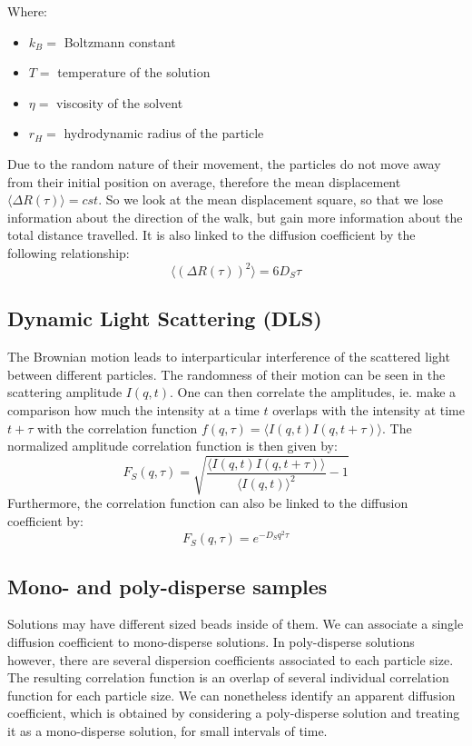 \documentclass{article}
\begin{document}
Where: \begin{itemize}
    \item $k_B =$ Boltzmann constant
    \item $T =$ temperature of the solution
    \item $\eta =$ viscosity of the solvent
    \item $r_H =$ hydrodynamic radius of the particle 
\end{itemize}

Due to the random nature of their movement, the particles do not move away from their initial position on average, therefore the mean displacement $\langle \Delta R(\tau) \rangle = cst$. So we look at the mean displacement square, so that we lose information about the direction of the walk, but gain more information about the total distance travelled. It is also linked to the diffusion coefficient by the following relationship:
\begin{equation}
    \langle (\Delta R(\tau))^2 \rangle = 6 D_S \tau
\end{equation}

\subsection{Dynamic Light Scattering (DLS)}
The Brownian motion leads to interparticular interference of the scattered light between different particles. The randomness of their motion can be seen in the scattering amplitude $I(q,t)$. One can then correlate the amplitudes, ie. make a comparison how much the intensity at a time $t$ overlaps with the intensity at time $t+\tau$ with the correlation function $f(q,\tau) = \langle I(q,t)I(q,t+\tau)\rangle$. The normalized amplitude correlation function is then given by:
\begin{equation}
    F_S(q,\tau) = \sqrt{\frac{\langle I(q,t)I(q,t+\tau) \rangle}{\langle I(q,t) \rangle ^2}-1}
\end{equation}
Furthermore, the correlation function can also be linked to the diffusion coefficient by:
\begin{equation}
    F_S(q,\tau) = e^{-D_S q^2 \tau}
\end{equation}

\subsection{Mono- and poly-disperse samples}
Solutions may have different sized beads inside of them. We can associate a single diffusion coefficient to mono-disperse solutions. In poly-disperse solutions however, there are several dispersion coefficients associated to each particle size. The resulting correlation function is an overlap of several individual correlation function for each particle size. We can nonetheless identify an apparent diffusion coefficient, which is obtained by considering a poly-disperse solution and treating it as a mono-disperse solution, for small intervals of time. 
\end{document}
